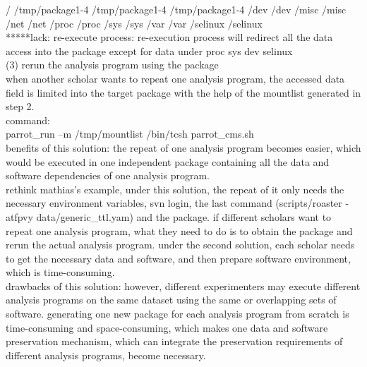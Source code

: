 \documentclass{article}
\begin{document}
/ /tmp/package1-4
/tmp/package1-4 /tmp/package1-4
/dev /dev
/misc /misc
/net /net
/proc /proc
/sys /sys
/var /var
/selinux /selinux\\

*****lack: re-execute process: re-execution process will redirect all the data access into the package except for data under proc sys dev selinux\\

(3) rerun the analysis program using the package\\
when another scholar wants to repeat one analysis program, the accessed data field is limited into the target package with the help of the mountlist generated in step 2. \\

command:\\
parrot\_run –m /tmp/mountlist /bin/tcsh parrot\_cms.sh\\

benefits of this solution: the repeat of one analysis program becomes easier, which would be executed in one independent package containing all the data and software dependencies of one analysis program. \\

rethink mathias’s example, under this solution, the repeat of it only needs the necessary environment variables, svn login,  the last command (scripts/roaster -atfpvy data/generic\_ttl.yam) and the package. if different scholars want to repeat one analysis program, what they need to do is to obtain the package and rerun the actual analysis program. under the second solution, each scholar needs to get the necessary data and software, and then prepare software environment, which is time-consuming. \\

drawbacks of this solution: however, different experimenters may execute different analysis programs on the same dataset using the same or overlapping sets of software. generating one new package for each analysis program from scratch is time-consuming and space-consuming, which makes one data and software preservation mechanism, which can integrate the preservation requirements of different analysis programs, become necessary. \\
\end{document}
